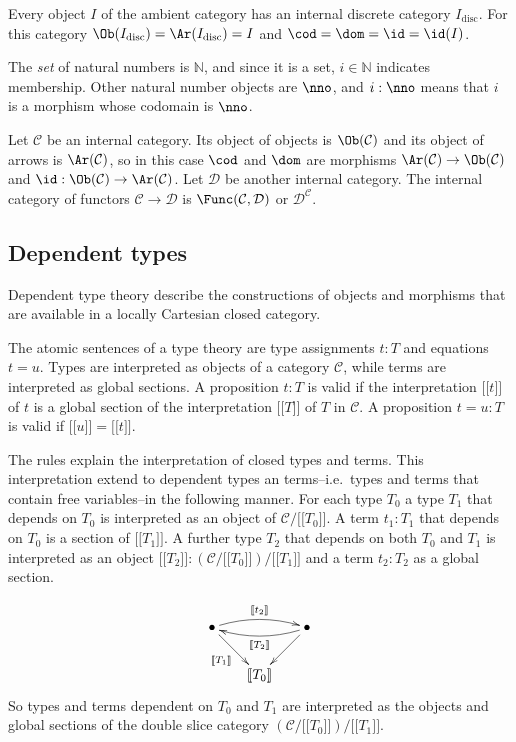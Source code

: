 \documentclass{tac}
\newcommand\hide[1]{}
\newcommand\cat\mathcal
\newcommand\N{\mathbb N}
\newcommand\disc{_{\mathrm{disc}}}
\newcommand\of{:}
\newcommand\db[1]{{[\![}#1{]\!]}}
\begin{document}
Every object $I$ of the ambient category has an internal discrete category $I\disc$. For this category $\Ob(I\disc)=\Ar(I\disc)=I$ and $\cod=\dom=\id=\id(I)$.

The \emph{set} of natural numbers is $\N$, and since it is a set, $i\in \N$ indicates membership. Other natural number objects are $\nno$, and $i\of\nno$ means that $i$ is a morphism whose codomain is $\nno$.

Let $\cat C$ be an internal category. Its object of objects is $\Ob(\cat C)$ and its object of arrows is $\Ar(\cat C)$, so in this case $\cod$ and $\dom$ are morphisms $\Ar(\cat C)\to\Ob(\cat C)$ and $\id\of\Ob(\cat C)\to\Ar(\cat C)$. Let $\cat D$ be another internal category. The internal category of functors $\cat C\to\cat D$ is $\Func(\cat C,\cat D)$ or $\cat D^{\cat C}$.


\subsection{Dependent types}
Dependent type theory describe the constructions of objects and morphisms that are available in a locally Cartesian closed category.

The atomic sentences of a type theory are type assignments $t\of T$ and equations $t=u$. Types are interpreted as objects of a category $\cat C$, while terms are interpreted as global sections. A proposition $t\of T$ is valid if the interpretation $\db t$ of $t$ is a global section of the interpretation $\db T$ of $T$ in $\cat C$. A proposition $t=u\of T$ is valid if $\db u=\db t$. 

The rules explain the interpretation of closed types and terms. This interpretation extend to dependent types an terms--i.e.\ types and terms that contain free variables--in the following manner. For each type $T_0$ a type $T_1$ that depends on $T_0$ is interpreted as an object of $\cat C/\db{T_0}$. A term $t_1\of T_1$ that depends on $T_0$ is a section of $\db{T_1}$. A further type $T_2$ that depends on both $T_0$ and $T_1$ is interpreted as an object $\db{T_2}\of(\cat C/\db{T_0})/\db{T_1}$ and a term $t_2\of T_2$ as a global section.
\hide{\[\xymatrix{
& \bullet\ar[dl]^{\db{T_2}}\ar[d]\\ 
\bullet\ar[r]_{\db{T_1}}\ar@/^/[ur]^{\db{t_2}} & \db{T_0}
}\]}
\[\xy
(0,12)*+{\bullet} = "top left",(24,12)*+{\bullet} = "top right",(12,0)*+{\db{T_0}} = "bottom"
\ar "top right";"bottom" \ar_{\db{T_1}} "top left";"bottom" 
\ar@/^/@{->}^{\db{T_2}} "top right";"top left"
\ar@/^/@{->}^{\db{t_2}} "top left";"top right"
\endxy\]
So types and terms dependent on $T_0$ and $T_1$ are interpreted as the objects and global sections of the double slice category $(\cat C/\db{T_0})/\db{T_1}$.
\end{document}

